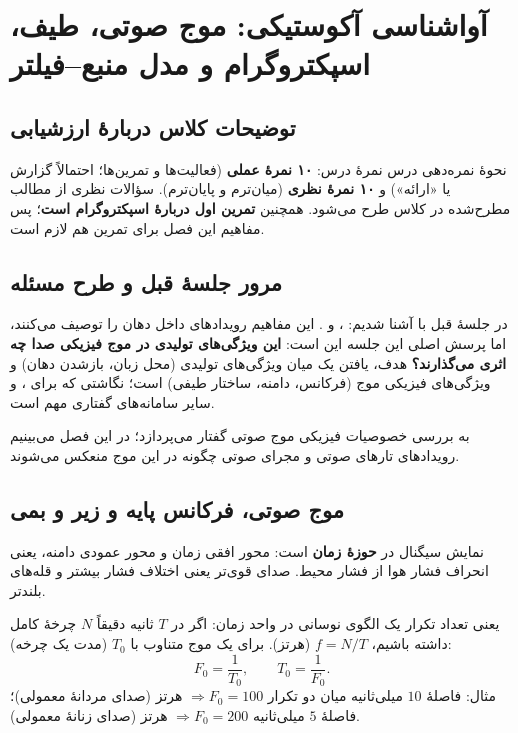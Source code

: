\chapter{آواشناسی آکوستیکی: موج صوتی، طیف، اسپکتروگرام و مدل منبع--فیلتر}

\section{توضیحات کلاس دربارهٔ ارزشیابی}

\begin{exambox}{نحوهٔ نمره‌دهی درس}
نمرهٔ درس: \textbf{۱۰ نمرهٔ عملی} (فعالیت‌ها و تمرین‌ها؛ احتمالاً گزارش یا «ارائه») و \textbf{۱۰ نمرهٔ نظری} (میان‌ترم و پایان‌ترم). سؤالات نظری از مطالب مطرح‌شده در کلاس طرح می‌شود. همچنین \textbf{تمرین اول دربارهٔ اسپکتروگرام است}؛ پس مفاهیم این فصل برای تمرین هم لازم است.
\end{exambox}

\section{مرور جلسهٔ قبل و طرح مسئله}

در جلسهٔ قبل با  آشنا شدیم: ،  و . این مفاهیم رویدادهای داخل دهان را توصیف می‌کنند، اما پرسش اصلی این جلسه این است: \textbf{این ویژگی‌های تولیدی در موج فیزیکی صدا چه اثری می‌گذارند؟} هدف، یافتن یک  میان ویژگی‌های تولیدی (محل زبان، بازشدن دهان) و ویژگی‌های فیزیکی موج (فرکانس، دامنه، ساختار طیفی) است؛ نگاشتی که برای ،  و سایر سامانه‌های گفتاری مهم است.

 به بررسی خصوصیات فیزیکی موج صوتی گفتار می‌پردازد؛ در این فصل می‌بینیم رویدادهای تارهای صوتی و مجرای صوتی چگونه در این موج منعکس می‌شوند.

\section{موج صوتی، فرکانس پایه و زیر و بمی}

 نمایش سیگنال در \textbf{حوزهٔ زمان} است: محور افقی زمان و محور عمودی دامنه، یعنی انحراف فشار هوا از فشار محیط. صدای قوی‌تر یعنی اختلاف فشار بیشتر و قله‌های بلندتر.

 یعنی تعداد تکرار یک الگوی نوسانی در واحد زمان: اگر در $T$ ثانیه دقیقاً $N$ چرخهٔ کامل داشته باشیم، $f=N/T$ (هرتز). برای یک موج متناوب با  $T_0$ (مدت یک چرخه):
\[
F_0=\frac{1}{T_0},\qquad T_0=\frac{1}{F_0}.
\]
مثال: فاصلهٔ $10$ میلی‌ثانیه میان دو تکرار $\Rightarrow F_0=100$ هرتز (صدای مردانهٔ معمولی)؛ فاصلهٔ $5$ میلی‌ثانیه $\Rightarrow F_0=200$ هرتز (صدای زنانهٔ معمولی).

